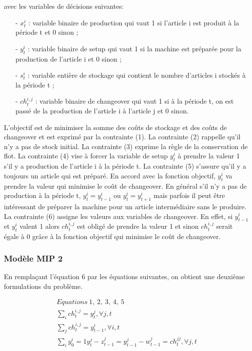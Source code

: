 \documentclass[12pt,a4paper]{article}
\begin{document}
		avec les variables de décisions suivantes: \\
		\begin{itemize}
			\item[-] $x_{t}^{i}$ : variable binaire de production qui vaut 1 si l’article i est produit à la période t et 0 sinon ;
			\item[-] $y_{t}^{i}$ : variable binaire de setup qui vaut 1 si la machine est préparée pour la production de l’article i et 0 sinon ;
			\item[-] $s_{t}^{i}$ : variable entière de stockage qui contient le nombre d’articles i stockés à la période t ; 
			\item[-] $ch_{t}^{i,j}$ : variable binaire de changeover qui vaut 1 si à la période t, on est passé de la production de l’article i à l’article j et 0 sinon.
		\end{itemize}
		\vspace*{.3cm}
	\hspace*{.5cm} L'objectif est de minimiser la somme des coûts de stockage et des coûts de changeover et est exprimé par la contrainte (1). La contrainte (2) rappelle qu'il n'y a pas de stock initial. La contrainte (3) exprime la règle de la conservation de flot. La contrainte (4) vise à forcer la variable de setup $y_{t}^{i}$ à prendre la valeur 1 s’il y a production de l’article i à la période t. La contrainte (5) s'assure qu'il y a toujours un article qui est préparé. En accord avec la fonction objectif, $y_{t}^{i}$ va prendre la valeur qui minimise le coût de changeover. En général s’il n’y a pas de production à la période t,
$y_{t}^{i} = y_{t-1}^{i}$ ou $y_{t}^{i} = y_{t+1}^{i}$
mais parfois il peut être intéressant de préparer
la machine pour un article intermédiaire sans le produire. La contrainte (6) assigne les valeurs aux variables de changeover.
En effet, si $y_{t-1}^{i}$ et $y_{t}^{i}$ valent 1 alors $ch_{t}^{i,j}$ est obligé de prendre la valeur 1 et sinon $ch_{t}^{i,j}$ serait égale à 0 grâce à la fonction objectif qui minimise le coût de changeover.
		
		\subsubsection{Modèle MIP 2}
		En remplaçant l'équation 6 par les équations suivantes, on obtient une deuxième formulations du problème.
		
		\begin{eqnarray}
			Equations \ 1,\ 2,\ 3,\ 4,\ 5 \\
			\sum_{i} ch_{t}^{i,j} = y_{t}^{j}, \forall j,t \\	
			\sum_{j} ch_{t}^{i,j} = y_{t-1}^{i}, \forall i,t \\
			\sum_{i} y_{0}^{i} = 1
			y_{t}^{j} - z_{t-1}^{j} = y_{t-1}^{j} - w_{t-1}^{j} = ch_{t}^{jj}, \forall j,t		
		\end{eqnarray}
		
\end{document}
